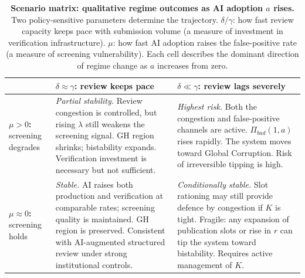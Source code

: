 \documentclass{article}
\begin{document}
\begin{table}[hbt!]
\centering
\caption{\textbf{Scenario matrix: qualitative regime outcomes as AI adoption $a$ rises.}
Two policy-sensitive parameters determine the trajectory.
$\delta/\gamma$: how fast review capacity keeps pace with submission volume (a measure of investment in verification infrastructure).
$\mu$: how fast AI adoption raises the false-positive rate (a measure of screening vulnerability).
Each cell describes the dominant direction of regime change as $a$ increases from zero.}
\label{tab:scenario_matrix}
\renewcommand{\arraystretch}{1.6}
\small
\begin{tabularx}{\textwidth}{p{3.0cm} X X}
\toprule
 & \textbf{$\delta \approx \gamma$: review keeps pace} & \textbf{$\delta \ll \gamma$: review lags severely} \\
\midrule
\textbf{$\mu > 0$:} screening degrades
  & \textit{Partial stability.}
    Review congestion is controlled, but rising $\lambda$ still weakens the screening signal.
    GH region shrinks; bistability expands.
    Verification investment is necessary but not sufficient.
  & \textit{Highest risk.}
    Both the congestion and false-positive channels are active.
    $\Pi_{bad}(1,a)$ rises rapidly.
    The system moves toward Global Corruption.
    Risk of irreversible tipping is high. \\
\midrule
\textbf{$\mu \approx 0$:} screening holds
  & \textit{Stable.}
    AI raises both production and verification at comparable rates; screening quality is maintained.
    GH region is preserved.
    Consistent with AI-augmented structured review under strong institutional controls.
  & \textit{Conditionally stable.}
    Slot rationing may still provide defence by congestion if $K$ is tight.
    Fragile: any expansion of publication slots or rise in $r$ can tip the system toward bistability.
    Requires active management of $K$. \\
\bottomrule
\end{tabularx}
\end{table}
\end{document}
